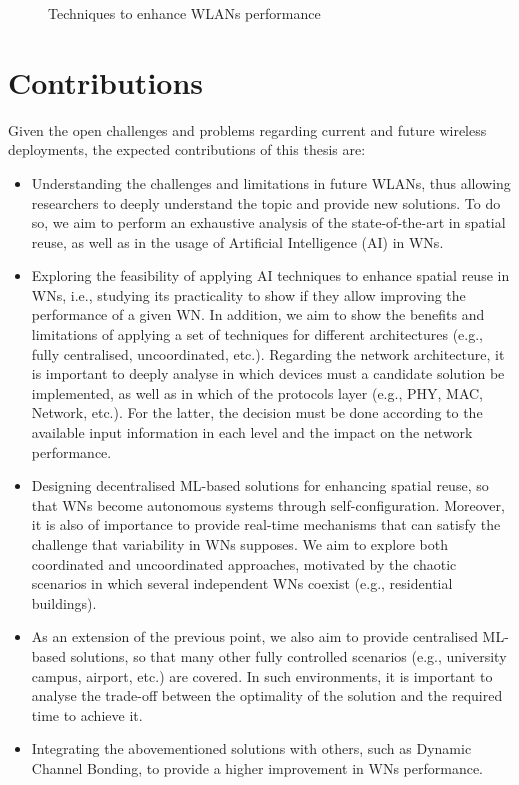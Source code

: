 \documentclass[12pt, a4paper,twoside]{tesi_upf}
\begin{document}
			\begin{figure}[h!]
				\centering
				\caption{Techniques to enhance WLANs performance}
				\label{fig:techniques_wns}
			\end{figure}	
		
		\section{Contributions}
		\label{section:contributions}
			Given the open challenges and problems regarding current and future wireless deployments, the expected contributions of this thesis are:	
			\begin{itemize}
				\item Understanding the challenges and limitations in future WLANs, thus allowing researchers to deeply understand the topic and provide new solutions. To do so, we aim to perform an exhaustive analysis of the state-of-the-art in spatial reuse, as well as in the usage of Artificial Intelligence (AI) in WNs.  			
				\item Exploring the feasibility of applying AI techniques to enhance spatial reuse in WNs, i.e., studying its practicality to show if they allow improving the performance of a given WN. In addition, we aim to show the benefits and limitations of applying a set of techniques for different architectures (e.g., fully centralised, uncoordinated, etc.). Regarding the network architecture, it is important to deeply analyse in which devices must a candidate solution be implemented, as well as in which of the protocols layer (e.g., PHY, MAC, Network, etc.). For the latter, the decision must be done according to the available input information in each level and the impact on the network performance.					
				\item Designing decentralised ML-based solutions for enhancing spatial reuse, so that WNs become autonomous systems through self-configuration. Moreover, it is also of importance to provide real-time mechanisms that can satisfy the challenge that variability in WNs supposes. We aim to explore both coordinated and uncoordinated approaches, motivated by the chaotic scenarios in which several independent WNs coexist (e.g., residential buildings).
				\item As an extension of the previous point, we also aim to provide centralised ML-based solutions, so that many other fully controlled scenarios (e.g., university campus, airport, etc.) are covered. In such environments, it is important to analyse the trade-off between the optimality of the solution and the required time to achieve it.
				\item Integrating the abovementioned solutions with others, such as Dynamic Channel Bonding, to provide a higher improvement in WNs performance.
			\end{itemize}		
			
\end{document}
